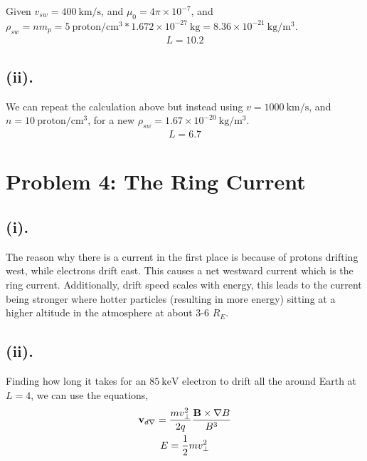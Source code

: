 \documentclass[11pt]{article}
\begin{document}
\hspace*{2em}Given $v_{sw} = 400~\mathrm{km/s}$, and $\mu_0 = 4\pi \times 10^{-7}$, 
and $\rho_{sw} = nm_p = 5~\mathrm{proton/cm^3}*1.672\times10^{-27}~\mathrm{kg} = 8.36\times10^{-21}~\mathrm{kg/m^3}$.
\begin{gather*}
\boxed{L = 10.2}
\end{gather*}

\subsection*{(ii).}
\hspace*{2em}We can repeat the calculation above but instead using $v=1000~\mathrm{km/s}$, and $n=10~\mathrm{proton/cm^3}$, for a new $\rho_{sw} = 1.67\times10^{-20}~\mathrm{kg/m^3}$.
\begin{gather*}
\boxed{L = 6.7}
\end{gather*}


\newpage
\section*{Problem 4: The Ring Current}
\subsection*{(i).}
\hspace*{2em}The reason why there is a current in the first place is because of protons drifting west, while electrons drift east. This causes a net westward current which is the ring current. Additionally, drift speed scales with energy, this leads to the current being stronger where hotter particles (resulting in more energy) sitting at a higher altitude in the atmosphere at about 3-6 $R_E$.

\subsection*{(ii).}
\hspace*{2em}Finding how long it takes for an $85~\mathrm{keV}$ electron to drift all the around Earth at $L=4$, we can use the equations, 
\begin{gather*}
\bold{v}_{d\nabla} = \frac{mv_{\perp}^2}{2q} \frac{\bold{B}\times \nabla B}{B^3} \\
E = \frac{1}{2}m v_{\perp}^2
\end{gather*}
\end{document}
